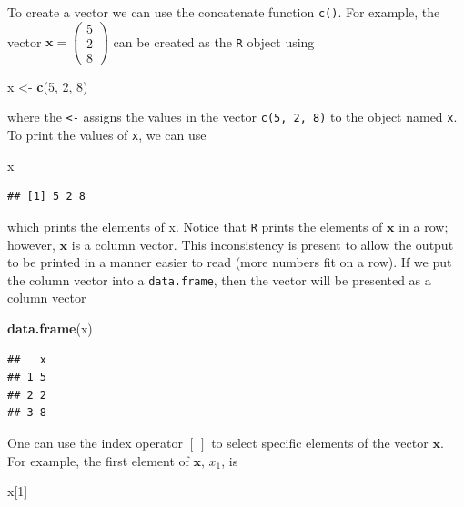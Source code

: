 \documentclass[
]{book}
\newenvironment{Shaded}{\begin{snugshade}}{\end{snugshade}}
\newcommand{\DecValTok}[1]{\textcolor[rgb]{0.00,0.00,0.81}{#1}}
\newcommand{\KeywordTok}[1]{\textcolor[rgb]{0.13,0.29,0.53}{\textbf{#1}}}
\newcommand{\NormalTok}[1]{#1}
\newcommand{\StringTok}[1]{\textcolor[rgb]{0.31,0.60,0.02}{#1}}
\theoremstyle{definition}
\theoremstyle{definition}
\theoremstyle{definition}
\theoremstyle{definition}
\theoremstyle{remark}
\begin{document}
To create a vector we can use the concatenate function \texttt{c()}. For example, the vector \(\mathbf{x} = \begin{pmatrix} 5 \\ 2 \\ 8 \end{pmatrix}\) can be created as the \texttt{R} object using

\begin{Shaded}
\begin{Highlighting}[]
\NormalTok{x <-}\StringTok{ }\KeywordTok{c}\NormalTok{(}\DecValTok{5}\NormalTok{, }\DecValTok{2}\NormalTok{, }\DecValTok{8}\NormalTok{)}
\end{Highlighting}
\end{Shaded}

where the \texttt{\textless{}-} assigns the values in the vector \texttt{c(5,\ 2,\ 8)} to the object named \texttt{x}. To print the values of \texttt{x}, we can use

\begin{Shaded}
\begin{Highlighting}[]
\NormalTok{x}
\end{Highlighting}
\end{Shaded}

\begin{verbatim}
## [1] 5 2 8
\end{verbatim}

which prints the elements of x. Notice that \texttt{R} prints the elements of \(\mathbf{x}\) in a row; however, \(\mathbf{x}\) is a column vector. This inconsistency is present to allow the output to be printed in a manner easier to read (more numbers fit on a row). If we put the column vector into a \texttt{data.frame}, then the vector will be presented as a column vector

\begin{Shaded}
\begin{Highlighting}[]
\KeywordTok{data.frame}\NormalTok{(x)}
\end{Highlighting}
\end{Shaded}

\begin{verbatim}
##   x
## 1 5
## 2 2
## 3 8
\end{verbatim}

One can use the index operator \([\ ]\) to select specific elements of the vector \(\mathbf{x}\). For example, the first element of \(\mathbf{x}\), \(x_1\), is

\begin{Shaded}
\begin{Highlighting}[]
\NormalTok{x[}\DecValTok{1}\NormalTok{]}
\end{Highlighting}
\end{Shaded}
\end{document}
